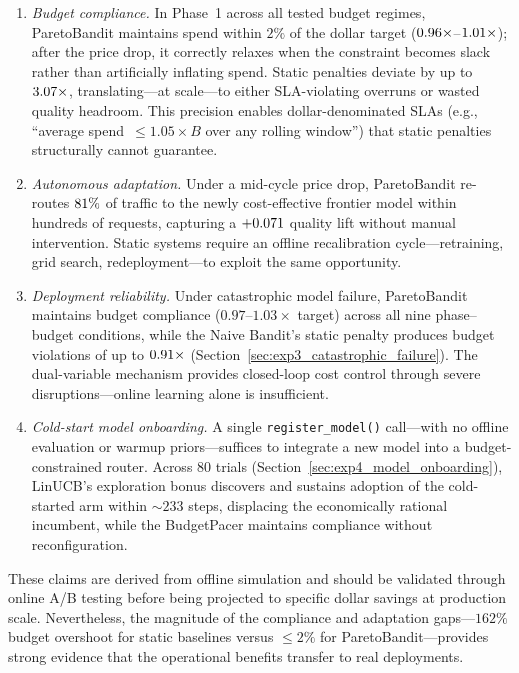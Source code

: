 \begin{enumerate}[nosep,leftmargin=*]
  \item \emph{Budget compliance.}  In Phase~1 across all tested budget regimes, ParetoBandit maintains spend within $2\%$ of the dollar target ($0.96\times$--$1.01\times$); after the price drop, it correctly relaxes when the constraint becomes slack rather than artificially inflating spend.  Static penalties deviate by up to $3.07\times$, translating---at scale---to either SLA-violating overruns or wasted quality headroom.  This precision enables dollar-denominated SLAs (e.g., ``average spend~$\leq 1.05{\times}B$ over any rolling window'') that static penalties structurally cannot guarantee.
  \item \emph{Autonomous adaptation.}  Under a mid-cycle price drop, ParetoBandit re-routes $81\%$ of traffic to the newly cost-effective frontier model within hundreds of requests, capturing a $+0.071$ quality lift without manual intervention.  Static systems require an offline recalibration cycle---retraining, grid search, redeployment---to exploit the same opportunity.
  \item \emph{Deployment reliability.}  Under catastrophic model failure, ParetoBandit maintains budget compliance ($0.97$--$1.03\times$ target) across all nine phase--budget conditions, while the Naive Bandit's static penalty produces budget violations of up to $0.91\times$ (Section~\ref{sec:exp3_catastrophic_failure}).  The dual-variable mechanism provides closed-loop cost control through severe disruptions---online learning alone is insufficient.
  \item \emph{Cold-start model onboarding.}  A single \texttt{register\_model()} call---with no offline evaluation or warmup priors---suffices to integrate a new model into a budget-constrained router.  Across 80 trials (Section~\ref{sec:exp4_model_onboarding}), LinUCB's exploration bonus discovers and sustains adoption of the cold-started arm within ${\sim}233$ steps, displacing the economically rational incumbent, while the BudgetPacer maintains compliance without reconfiguration.
\end{enumerate}
These claims are derived from offline simulation and should be validated through online A/B testing before being projected to specific dollar savings at production scale.  Nevertheless, the magnitude of the compliance and adaptation gaps---$162\%$ budget overshoot for static baselines versus ${\leq}2\%$ for ParetoBandit---provides strong evidence that the operational benefits transfer to real deployments.

